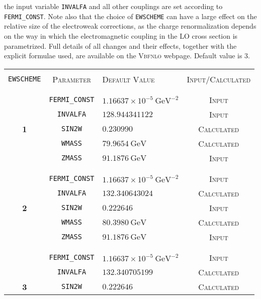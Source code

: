 \documentclass[english,12pt]{article}
\begin{document}
\begin{itemize}
the input variable {\tt INVALFA} and all other couplings are set according to
{\tt FERMI\_CONST}.  Note also that the choice of {\tt EWSCHEME} can
have a large effect on the relative size of the electroweak corrections, as the
charge renormalization depends on the way in which the electromagnetic coupling 
in the LO cross section is parametrized. Full details of all
changes and their effects, together with the explicit formulae used, are
available on the \textsc{Vbfnlo} webpage. Default value is 3.
\begin{table}[t!]
\newcommand{\lstrut}{{$\strut\atop\strut$}}
\begin{center}
\begin{tabular}{c|c|l|c}
\hline
&&&\\
{\tt EWSCHEME} & \textsc{Parameter} & \textsc{Default Value} & \textsc{Input/Calculated} \\
&&&\\
\hline
&&&\\
 & {\tt FERMI\_CONST} & $1.16637\times 10^{-5} \ \mathrm{GeV}^{-2}$ & \textsc{Input}\\
 & {\tt INVALFA} & $128.944341122$ & \textsc{Input}\\
\bf 1 & {\tt SIN2W} & $0.230990$ & \textsc{Calculated} \\
 & {\tt WMASS} & $79.9654 \ \mathrm{GeV}$ & \textsc{Calculated}\\
 & {\tt ZMASS} & $91.1876 \ \mathrm{GeV}$ & \textsc{Input}\\
&&&\\
\hline
&&&\\
 & {\tt FERMI\_CONST} & $1.16637 \times 10^{-5} \ \mathrm{GeV}^{-2}$ & \textsc{Input}\\
 & {\tt INVALFA} & $132.340643024$ & \textsc{Calculated}\\
\bf 2 & {\tt SIN2W} & $0.222646$ & \textsc{Input}\\
 & {\tt WMASS} & $ 80.3980 \ \mathrm{GeV}$ & \textsc{Calculated}\\
 & {\tt ZMASS} & $91.1876 \ \mathrm{GeV}$ & \textsc{Input}\\
&&&\\
\hline
&&&\\
 &{\tt FERMI\_CONST} & $1.16637 \times 10^{-5} \ \mathrm{GeV}^{-2}$ & \textsc{Input}\\
 &{\tt INVALFA} & $132.340705199$ & \textsc{Calculated}\\
\bf 3 &{\tt SIN2W} & $0.222646$ & \textsc{Calculated}\\

\end{tabular}
\end{center}
\end{table}
\end{itemize}
\end{document}
